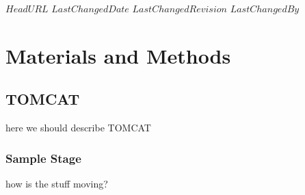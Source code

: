 \svnidlong
{$HeadURL$}
{$LastChangedDate$}
{$LastChangedRevision$}
{$LastChangedBy$}

\section{Materials and Methods}
\subsection{TOMCAT}
here we should describe TOMCAT
\subsubsection{Sample Stage}
how is the stuff moving?
